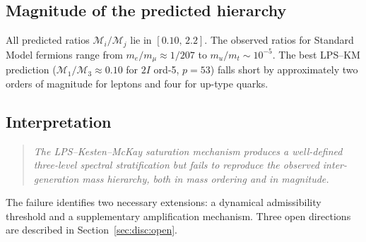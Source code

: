   \subsection{Magnitude of the predicted hierarchy}
    \label{sec:amp:magnitude}

    All predicted ratios $\mathcal{M}_i/\mathcal{M}_j$ lie in $[0.10,\, 2.2]$.
    The observed ratios for Standard Model fermions range from $m_e/m_\mu \approx
1/207$ to $m_u/m_t \sim 10^{-5}$.
    The best LPS--KM prediction ($\mathcal{M}_1/\mathcal{M}_3 \approx 0.10$ for
    $2I$ ord-5, $p=53$) falls short by approximately two orders of magnitude for
    leptons and four for up-type quarks.

  \subsection{Interpretation}
    \label{sec:amp:interpretation}

    \begin{quote}
      \emph{The LPS--Kesten--McKay saturation mechanism produces a well-defined
      three-level spectral stratification but fails to reproduce the observed
      inter-generation mass hierarchy, both in mass ordering and in magnitude.}
    \end{quote}

    The failure identifies two necessary extensions: a dynamical admissibility
    threshold and a supplementary amplification mechanism.
    Three open directions are described in Section~\ref{sec:disc:open}.
